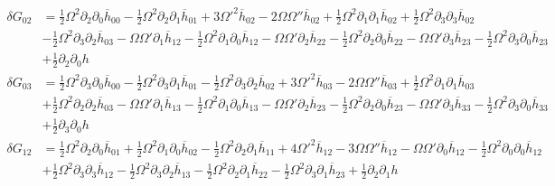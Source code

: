\documentclass[10pt,letterpaper]{article}
\numberwithin{equation}{section}
\begin{document}
\begin{align}
	\delta G_{02} &= \tfrac{1}{2} \Omega^2 \partial_{2} \partial_{0} \overline{h}_{00} -  \tfrac{1}{2} \Omega^2 \partial_{2} \partial_{1} \overline{h}_{01} + 3 \Omega '^2 \overline{h}_{02} - 2 \Omega \Omega '' \overline{h}_{02} + \tfrac{1}{2} \Omega^2 \partial_{1} \partial_{1} \overline{h}_{02} + \tfrac{1}{2} \Omega^2 \partial_{3} \partial_{3} \overline{h}_{02}\\
& -  \tfrac{1}{2} \Omega^2 \partial_{3} \partial_{2} \overline{h}_{03} -  \Omega \Omega ' \partial_{1} \overline{h}_{12} -  \tfrac{1}{2} \Omega^2 \partial_{1} \partial_{0} \overline{h}_{12} -  \Omega \Omega ' \partial_{2} \overline{h}_{22} -  \tfrac{1}{2} \Omega^2 \partial_{2} \partial_{0} \overline{h}_{22} -  \Omega \Omega ' \partial_{3} \overline{h}_{23} -  \tfrac{1}{2} \Omega^2 \partial_{3} \partial_{0} \overline{h}_{23}\nonumber \\
& + \tfrac{1}{2} \partial_{2} \partial_{0} h\nonumber 
\end{align}
\begin{align}
	\delta G_{03} &=\tfrac{1}{2} \Omega^2 \partial_{3} \partial_{0} \overline{h}_{00} -  \tfrac{1}{2} \Omega^2 \partial_{3} \partial_{1} \overline{h}_{01} -  \tfrac{1}{2} \Omega^2 \partial_{3} \partial_{2} \overline{h}_{02} + 3 \Omega '^2 \overline{h}_{03} - 2 \Omega \Omega '' \overline{h}_{03} + \tfrac{1}{2} \Omega^2 \partial_{1} \partial_{1} \overline{h}_{03}\\
&+ \tfrac{1}{2} \Omega^2 \partial_{2} \partial_{2} \overline{h}_{03} -  \Omega \Omega ' \partial_{1} \overline{h}_{13} -  \tfrac{1}{2} \Omega^2 \partial_{1} \partial_{0} \overline{h}_{13} -  \Omega \Omega ' \partial_{2} \overline{h}_{23} -  \tfrac{1}{2} \Omega^2 \partial_{2} \partial_{0} \overline{h}_{23} -  \Omega \Omega ' \partial_{3} \overline{h}_{33} -  \tfrac{1}{2} \Omega^2 \partial_{3} \partial_{0} \overline{h}_{33}\nonumber \\
& + \tfrac{1}{2} \partial_{3} \partial_{0} h \nonumber
\end{align}
\begin{align}
	\delta G_{12} &=\tfrac{1}{2} \Omega^2 \partial_{2} \partial_{0} \overline{h}_{01} + \tfrac{1}{2} \Omega^2 \partial_{1} \partial_{0} \overline{h}_{02} -  \tfrac{1}{2} \Omega^2 \partial_{2} \partial_{1} \overline{h}_{11} + 4 \Omega '^2 \overline{h}_{12} - 3 \Omega \Omega '' \overline{h}_{12} -  \Omega \Omega ' \partial_{0} \overline{h}_{12} -  \tfrac{1}{2} \Omega^2 \partial_{0} \partial_{0} \overline{h}_{12}\nonumber \\
&+ \tfrac{1}{2} \Omega^2 \partial_{3} \partial_{3} \overline{h}_{12} -  \tfrac{1}{2} \Omega^2 \partial_{3} \partial_{2} \overline{h}_{13} -  \tfrac{1}{2} \Omega^2 \partial_{2} \partial_{1} \overline{h}_{22} -  \tfrac{1}{2} \Omega^2 \partial_{3} \partial_{1} \overline{h}_{23} + \tfrac{1}{2} \partial_{2} \partial_{1} h
\end{align}
\end{document}
